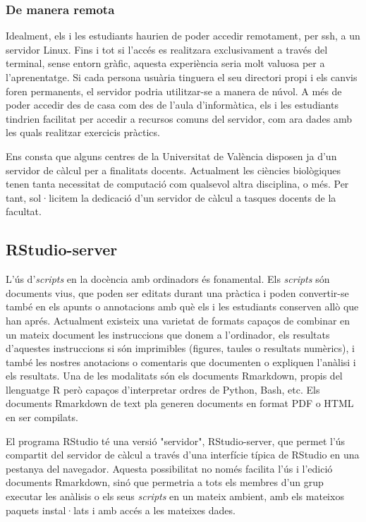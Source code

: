 \documentclass[a4paper,12pt]{article}
\begin{document}
\subsubsection{De manera remota}
Idealment, els i les estudiants haurien de poder accedir remotament, per \textsf{ssh},
a un servidor Linux. Fins i tot si l'accés es realitzara exclusivament a través del
terminal, sense entorn gràfic, aquesta experiència seria molt valuosa per a l'aprenentatge.
Si cada persona usuària tinguera el seu directori propi i els canvis foren permanents,
el servidor podria utilitzar-se a manera de núvol. A més de poder accedir des de casa com
des de l'aula d'informàtica, els i les estudiants tindrien facilitat per accedir a recursos comuns
del servidor, com ara dades amb les quals realitzar exercicis pràctics.

Ens consta que alguns centres de la Universitat de València disposen ja d'un servidor de
càlcul per a finalitats docents. Actualment les ciències biològiques tenen tanta necessitat
de computació com qualsevol altra disciplina, o més. Per tant, sol·licitem la dedicació
d'un servidor de càlcul a tasques docents de la facultat.

\subsection{RStudio-server}
L'ús d'\emph{scripts} en la docència amb ordinadors és fonamental. Els \emph{scripts}
són documents vius, que poden ser editats durant una pràctica i poden convertir-se també
en els apunts o annotacions amb què els i les estudiants conserven allò  que han aprés.
Actualment existeix una varietat de formats capaços de combinar en un mateix document
les instruccions que donem a l'ordinador, els resultats d'aquestes instruccions si són
imprimibles (figures, taules o resultats numèrics), i també les nostres anotacions o
comentaris que documenten o expliquen l'anàlisi i els resultats. Una de les modalitats
són els documents Rmarkdown, propis del llenguatge \textsf{R} però capaços d'interpretar
ordres de Python, Bash, etc. Els documents Rmarkdown de text pla generen documents
en format PDF o HTML en ser compilats.

El programa RStudio té una versió "servidor", RStudio-server, que permet l'ús compartit
del servidor de càlcul a través d'una interfície típica de RStudio en una pestanya del
navegador. Aquesta possibilitat no només facilita l'ús i l'edició documents Rmarkdown,
sinó que permetria a tots els membres d'un grup executar les anàlisis o els seus \emph{scripts}
en un mateix ambient, amb els mateixos paquets instal·lats i amb accés a les mateixes dades.
\end{document}
